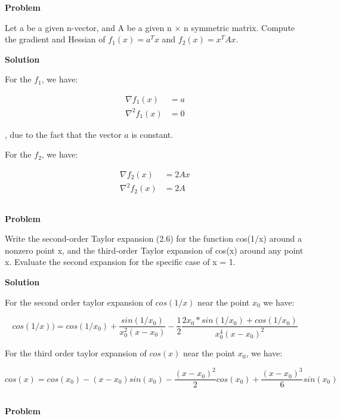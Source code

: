 \documentclass[a4paper,11pt]{article}
\numberwithin{equation}{section} %
\begin{document}
\textbf{Problem}

Let a be a given n-vector, and A be a given n × n symmetric matrix. Compute the
gradient and Hessian of $f_1(x) = a^T x$ and $f_2(x) = x^TAx$.

\textbf{Solution}

For the $f_1$, we have:

\begin{align}
    \nabla f_1(x) &= a \\
    \nabla^2 f_1(x) &= 0
\end{align}

, due to the fact that the vector $a$ is constant.

For the $f_2$, we have:

\begin{align}
    \nabla f_2(x) &= 2Ax \\
    \nabla^2 f_2(x) &= 2A
\end{align}

\subsection{}

\textbf{Problem}

Write the second-order Taylor expansion (2.6) for the function cos(1/x) around
a nonzero point x, and the third-order Taylor expansion of cos(x) around any point x. Evaluate the second expansion for the specific case of x = 1.

\textbf{Solution}

For the second order taylor expansion of $cos(1/x)$ near the point $x_0$ we have:

\begin{equation}
cos(1/x)) = cos(1/x_0) + \frac{sin(1/x_0)}{x_0^2 (x-x_0)} - \frac{1}{2} \frac{2x_0*sin(1/x_0) + cos(1/x_0)}{x_0^4(x-x_0)^2}
\end{equation}

For the third order taylor expansion of $cos(x)$ near the point $x_0$, we have:

\begin{equation}
    cos(x) = cos(x_0) - (x-x_0)sin(x_0) - \frac{(x-x_0)^2}{2}cos(x_0) + \frac{(x-x_0)^3}{6}sin(x_0)
\end{equation}

\subsection{}

\textbf{Problem}
\end{document}
